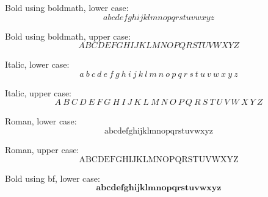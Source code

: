 Bold using boldmath, lower case:\boldmath
\begin{equation}
a  b  c  d  e  f  g  h  i  j  k  l  m  n  o  p  q  r  s  t  u  v  w  x  y  z
\end{equation}\unboldmath

Bold using boldmath, upper case:\boldmath
\begin{equation}
A  B  C  D  E  F  G  H  I  J  K  L  M  N  O  P  Q  R  S  T  U  V  W  X  Y  Z  
\end{equation}\unboldmath


Italic, lower case:
\begin{equation}
\mathit{a}~\mathit{b}~\mathit{c}~\mathit{d}~\mathit{e}~\mathit{f}~\mathit{g}~\mathit{h}~\mathit{i}~\mathit{j}~\mathit{k}~\mathit{l}~\mathit{m}~\mathit{n}~\mathit{o}~\mathit{p}~\mathit{q}~\mathit{r}~\mathit{s}~\mathit{t}~\mathit{u}~\mathit{v}~\mathit{w}~\mathit{x}~\mathit{y}~\mathit{z}
\end{equation}

Italic, upper case:
\begin{equation}
\mathit{A}~\mathit{B}~\mathit{C}~\mathit{D}~\mathit{E}~\mathit{F}~\mathit{G}~\mathit{H}~\mathit{I}~\mathit{J}~\mathit{K}~\mathit{L}~\mathit{M}~\mathit{N}~\mathit{O}~\mathit{P}~\mathit{Q}~\mathit{R}~\mathit{S}~\mathit{T}~\mathit{U}~\mathit{V}~\mathit{W}~\mathit{X}~\mathit{Y}~\mathit{Z}
\end{equation}

Roman, lower case:
\begin{equation}
\mathrm{a}  \mathrm{b}  \mathrm{c}  \mathrm{d}  \mathrm{e}  \mathrm{f}  \mathrm{g}  \mathrm{h}  \mathrm{i}  \mathrm{j}  \mathrm{k}  \mathrm{l}  \mathrm{m}  \mathrm{n}  \mathrm{o}  \mathrm{p}  \mathrm{q}  \mathrm{r}  \mathrm{s}  \mathrm{t}  \mathrm{u}  \mathrm{v}  \mathrm{w}  \mathrm{x}  \mathrm{y}  \mathrm{z}
\end{equation}

Roman, upper case:
\begin{equation}
\mathrm{A}  \mathrm{B}  \mathrm{C}  \mathrm{D}  \mathrm{E}  \mathrm{F}  \mathrm{G}  \mathrm{H}  \mathrm{I}  \mathrm{J}  \mathrm{K}  \mathrm{L}  \mathrm{M}  \mathrm{N}  \mathrm{O}  \mathrm{P}  \mathrm{Q}  \mathrm{R}  \mathrm{S}  \mathrm{T}  \mathrm{U}  \mathrm{V}  \mathrm{W}  \mathrm{X}  \mathrm{Y}  \mathrm{Z}
\end{equation}

Bold using bf, lower case:
\begin{equation}
\mathbf{a}  \mathbf{b}  \mathbf{c}  \mathbf{d}  \mathbf{e}  \mathbf{f}  \mathbf{g}  \mathbf{h}  \mathbf{i}  \mathbf{j}  \mathbf{k}  \mathbf{l}  \mathbf{m}  \mathbf{n}  \mathbf{o}  \mathbf{p}  \mathbf{q}  \mathbf{r}  \mathbf{s}  \mathbf{t}  \mathbf{u}  \mathbf{v}  \mathbf{w}  \mathbf{x}  \mathbf{y}  \mathbf{z}
\end{equation}

